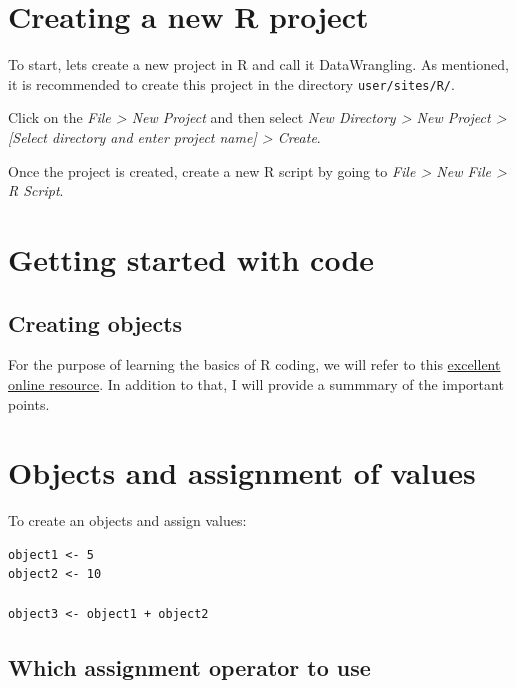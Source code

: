 \documentclass[]{book}
\begin{document}
\hypertarget{creating-a-new-r-project}{%
\section{Creating a new R project}\label{creating-a-new-r-project}}

To start, lets create a new project in R and call it DataWrangling. As mentioned, it is recommended to create this project in the directory \texttt{user/sites/R/}.

Click on the \emph{File \textgreater{} New Project} and then select \emph{New Directory \textgreater{} New Project \textgreater{} {[}Select directory and enter project name{]} \textgreater{} Create}.

Once the project is created, create a new R script by going to \emph{File \textgreater{} New File \textgreater{} R Script}.

\hypertarget{getting-started-with-code}{%
\section{Getting started with code}\label{getting-started-with-code}}

\hypertarget{creating-objects}{%
\subsection{Creating objects}\label{creating-objects}}

For the purpose of learning the basics of R coding, we will refer to this \href{https://cengel.github.io/R-intro/gettingstarted.html}{excellent online resource}. In addition to that, I will provide a summmary of the important points.

\hypertarget{objects-and-assignment-of-values}{%
\section{Objects and assignment of values}\label{objects-and-assignment-of-values}}

To create an objects and assign values:

\begin{verbatim}
object1 <- 5
object2 <- 10

object3 <- object1 + object2
\end{verbatim}

\hypertarget{which-assignment-operator-to-use}{%
\subsection{Which assignment operator to use}\label{which-assignment-operator-to-use}}
\end{document}
